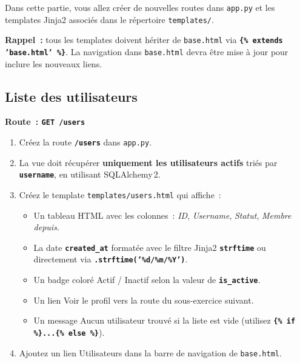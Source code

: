 \documentclass[12pt,a4paper]{article}
\newcommand{\fichier}[1]{\texttt{\textcolor{primary}{#1}}}
\newcommand{\kw}[1]{\texttt{\textbf{#1}}}
\begin{document}
Dans cette partie, vous allez créer de nouvelles routes dans \fichier{app.py} et les templates Jinja2 associés dans le répertoire \fichier{templates/}.

\begin{mdframed}[style=attention]
\textbf{Rappel~:} tous les templates doivent hériter de \fichier{base.html} via \kw{\{\% extends 'base.html' \%\}}.
La navigation dans \fichier{base.html} devra être mise à jour pour inclure les nouveaux liens.
\end{mdframed}

\subsection{Liste des utilisateurs}

\begin{mdframed}[style=exercice]
\textbf{Route~: \texttt{GET /users}}

\begin{enumerate}[label=\textbf{\arabic*.}]
    \item Créez la route \kw{/users} dans \fichier{app.py}.
    \item La vue doit récupérer \textbf{uniquement les utilisateurs actifs} triés par \kw{username}, en utilisant SQLAlchemy\,2.
    \item Créez le template \fichier{templates/users.html} qui affiche~:
    \begin{itemize}
        \item Un tableau HTML avec les colonnes~: \textit{ID}, \textit{Username}, \textit{Statut}, \textit{Membre depuis}.
        \item La date \kw{created\_at} formatée avec le filtre Jinja2 \kw{strftime} ou directement via \kw{.strftime('\%d/\%m/\%Y')}.
        \item Un badge coloré \og Actif \fg{} / \og Inactif \fg{} selon la valeur de \kw{is\_active}.
        \item Un lien \og Voir le profil \fg{} vers la route du sous-exercice suivant.
        \item Un message \og Aucun utilisateur trouvé \fg{} si la liste est vide (utilisez \kw{\{\% if \%\}...\{\% else \%\}}).
    \end{itemize}
    \item Ajoutez un lien \og Utilisateurs \fg{} dans la barre de navigation de \fichier{base.html}.
\end{enumerate}
\end{mdframed}
\end{document}
